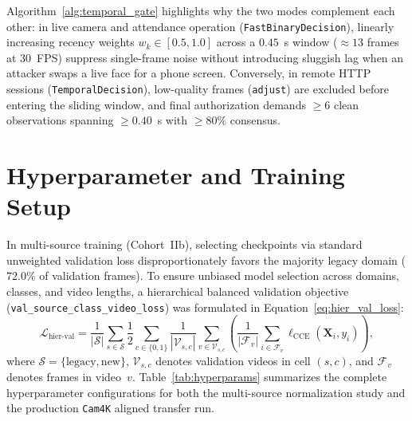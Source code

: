 Algorithm~\ref{alg:temporal_gate} highlights why the two modes complement each other: in live camera and attendance operation (\texttt{FastBinaryDecision}), linearly increasing recency weights $w_k \in [0.5, 1.0]$ across a $0.45$~s window ($\approx 13$ frames at $30$~FPS) suppress single-frame noise without introducing sluggish lag when an attacker swaps a live face for a phone screen. Conversely, in remote HTTP sessions (\texttt{TemporalDecision}), low-quality frames (\texttt{adjust}) are excluded before entering the sliding window, and final authorization demands $\ge 6$ clean observations spanning $\ge 0.40$~s with $\ge 80\%$ consensus.

\section{Hyperparameter and Training Setup}
\label{sec:hyperparameter_setup}

In multi-source training (Cohort~IIb), selecting checkpoints via standard unweighted validation loss disproportionately favors the majority legacy domain ($72.0\%$ of validation frames). To ensure unbiased model selection across domains, classes, and video lengths, a hierarchical balanced validation objective (\texttt{val\_source\_class\_video\_loss}) was formulated in Equation~\eqref{eq:hier_val_loss}:
\begin{equation}
\label{eq:hier_val_loss}
    \mathcal{L}_{\text{hier-val}} = \frac{1}{|\mathcal{S}|} \sum_{s \in \mathcal{S}} \frac{1}{2} \sum_{c \in \{0, 1\}} \frac{1}{|\mathcal{V}_{s,c}|} \sum_{v \in \mathcal{V}_{s,c}} \left( \frac{1}{|\mathcal{F}_v|} \sum_{i \in \mathcal{F}_v} \ell_{\text{CCE}}(\mathbf{X}_i, y_i) \right),
\end{equation}
where $\mathcal{S} = \{\text{legacy}, \text{new}\}$, $\mathcal{V}_{s,c}$ denotes validation videos in cell $(s,c)$, and $\mathcal{F}_v$ denotes frames in video~$v$. Table~\ref{tab:hyperparams} summarizes the complete hyperparameter configurations for both the multi-source normalization study and the production \texttt{Cam4K} aligned transfer run.

